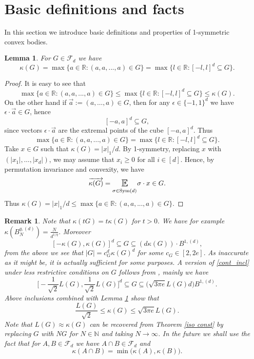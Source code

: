 \documentclass[10pt,a4paper]{amsart}
\numberwithin{equation}{section}
\newtheorem{Lem}[Thm]{Lemma}
\newtheorem{Rem}[Thm]{Remark}
\newcommand{\E}{\mathop{\mathbb{E}}}
\newcommand{\R}{\mathbb{R}}
\newcommand{\N}{\mathbb{N}}
\DeclareMathOperator{\Sym}{Sym}
\newcommand{\se}[1]{\underset{_{\substack{#1}}}{\mathlarger{\mathlarger{\E}}}}
\begin{document}




\section{Basic definitions and facts}
In this section we introduce basic definitions and properties of 1-symmetric convex bodies.
\begin{Lem} \label{lem:kappa_def}
    For $G \in \mathcal{F}_d$ we have
    \[
    \kappa(G)= \max\Big\{a \in \R : (a,a,...,a) \in G \Big\}=\max\Big\{l \in \R : [-l,l]^d \subseteq G \Big\}.
    \]
\end{Lem}
\begin{proof}
It is easy to see that 
\[
\max\Big\{a \in \R : (a,a,...,a) \in G \Big\} \le \max\Big\{l \in \R : [-l,l]^d \subseteq G \Big\} \le \kappa(G).
\]
On the other hand if $\overrightarrow{a}:=(a, \ldots ,a) \in G$, then for any $\epsilon \in \{-1,1\}^d$ we have $\epsilon \cdot \overrightarrow{a} \in G $, hence 
\[
[-a,a]^d \subseteq G,
\]
since vectors $\epsilon \cdot \overrightarrow{a}$ are the extremal points of the cube $[-a,a]^d$. Thus 
\[
\max\Big\{a \in \R : (a,a,...,a) \in G \Big\} = \max\Big\{l \in \R : [-l,l]^d \subseteq G \Big\}.
\]
Take $x \in G$ such that $\kappa(G)= |x|_1/d$. By 1-symmetry, replacing $x$ with $(|x_1|, \ldots, |x_d|)$, we may assume that $x_i \ge 0$ for all $i \in [d]$. Hence, by permutation invariance and convexity, we have
\[
\overrightarrow{\kappa(G)}= \se{\sigma \in \Sym(d)} \sigma \cdot x \in G.
\]
Thus $\kappa(G)= |x|_1/d \le \max\Big\{a \in \R : (a,a,...,a) \in G \Big\}$.
\end{proof}
\begin{Rem}
 Note that $\kappa(tG)=t\kappa(G)$ for $t>0$.
We have for example $\kappa(B_N^{q,(d)})= \frac{N}{d^{1/q}}.$ Moreover
\begin{equation} \label{cont_incl}
   [-\kappa(G),\kappa(G)]^d \subseteq G \subseteq (d \kappa(G) ) \cdot B^{1,(d)},
\end{equation}
from the above we see that $|G| = c_G^d \kappa(G)^d$ for some $c_G \in [2,2e]$. As inaccurate as it might be, it is actually sufficient for some purposes.
A version of \eqref{cont_incl} under less restrictive conditions on $G$ follows from \cite[Propositions 2.4, 2.5 and (2.2)]{bob-naz}, mainly we have 
\[
\Big[- \frac{1}{\sqrt{2}}L(G),\frac{1}{\sqrt{2}}L(G)\Big]^d \subseteq G \subseteq \big(\sqrt{3 \pi e}   L(G) d\big) B^{1,(d)}.
\]
Above inclusions combined with Lemma \ref{lem:kappa_def} show that
\begin{equation} \label{comparability of LG and kappaG}
    \frac{L(G)}{\sqrt{2}} \le \kappa(G) \le \sqrt{3 \pi e} L(G).
\end{equation}
Note that $L(G) \approx \kappa(G)$ can be recovered from Theorem \ref{iso const} by replacing $G$ with $NG$ for $N \in \N$ and taking $N \to \infty$.
In the future we shall use the fact that for $A,B \in \mathcal{F}_d$ we have $A \cap B \in \mathcal{F}_d$ and
\[
\kappa(A \cap B) = \min\big( \kappa(A), \kappa(B) \big).
\]
\end{Rem}
\end{document}
